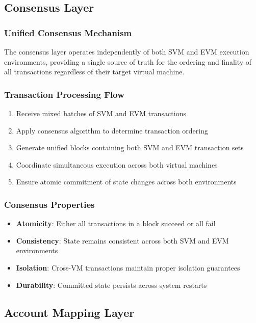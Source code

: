 \documentclass[11pt,a4paper]{article}
\begin{document}
\subsection{Consensus Layer}

\subsubsection{Unified Consensus Mechanism}
The consensus layer operates independently of both SVM and EVM execution environments, providing a single source of truth for the ordering and finality of all transactions regardless of their target virtual machine.

\subsubsection{Transaction Processing Flow}
\begin{enumerate}
    \item Receive mixed batches of SVM and EVM transactions
    \item Apply consensus algorithm to determine transaction ordering
    \item Generate unified blocks containing both SVM and EVM transaction sets
    \item Coordinate simultaneous execution across both virtual machines
    \item Ensure atomic commitment of state changes across both environments
\end{enumerate}

\subsubsection{Consensus Properties}
\begin{itemize}
    \item \textbf{Atomicity}: Either all transactions in a block succeed or all fail
    \item \textbf{Consistency}: State remains consistent across both SVM and EVM environments
    \item \textbf{Isolation}: Cross-VM transactions maintain proper isolation guarantees
    \item \textbf{Durability}: Committed state persists across system restarts
\end{itemize}

\subsection{Account Mapping Layer}
\end{document}
